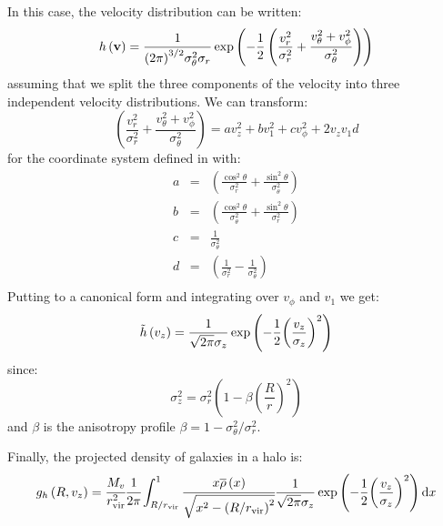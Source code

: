 In this case, the velocity distribution can be written:
\begin{equation}
    h\left(\textbf{v}\right)=
    \frac{1}{{\left({2\pi}\right)}^{3/2}\sigma_{\theta}^2\sigma_r}
    \exp\left(-\frac{1}{2}\left(\frac{v_r^2}{\sigma_r^2}+
    \frac{v_{\theta}^2+v_{\phi}^2}{\sigma_{\theta}^2}\right)\right)
\end{equation}
%
assuming that we split the three components of the velocity into three
independent velocity distributions. We can transform:
%
\begin{equation}
    \label{eq:poly}
    \left(\frac{v_r^2}{\sigma_r^2}+\frac{v_{\theta}^2+
    v_{\phi}^2}{\sigma_{\theta}^2}\right) =
    a v_z^2 + b v_1^2 + c v_\phi^2 + 2 v_z v_1 d
\end{equation}
%
for the coordinate system defined in
with:
%
\begin{eqnarray}
    a&=&\left(\frac{\cos^2\theta}{\sigma_r^2}+
        \frac{\sin^2\theta}{\sigma_\theta^2}\right)\nonumber\\
    b&=&\left(\frac{\cos^2\theta}{\sigma_\theta^2}+
        \frac{\sin^2\theta}{\sigma_r^2}\right)\nonumber\\
    c&=&\frac{1}{\sigma_\theta^2}\nonumber\\
    d&=&\left(\frac{1}{\sigma_r^2}-\frac{1}{\sigma_\theta^2}\right)\nonumber\\
\end{eqnarray}
%
Putting  to a canonical form and integrating
 over $v_\phi$ and $v_1$ we get:
%
\begin{equation} \tilde{h}\left(v_z\right) = \frac{1}{\sqrt{2\pi}\sigma_z}
\exp\left(-\frac{1}{2}{\left(\frac{v_z}{\sigma_z}\right)}^2\right) \end{equation}
%
since:
%
\begin{equation} \sigma_z^2 =
\sigma_r^2\left(1-\beta{\left(\frac{R}{r}\right)}^2\right) \end{equation}
%
and $\beta$ is the anisotropy profile $\beta=1-\sigma_\theta^2/\sigma_r^2$.

Finally, the projected density of galaxies in a halo is:
%
\begin{equation} g_h \left(R, v_z\right) =\cfrac{M_v}{r_{\rm vir}^2}
    \cfrac{1}{2\pi}
    \int_{R/r_{\rm vir}}^1
    \cfrac{x\overline\rho \left(x\right)}{\sqrt{x^2 -
    {\left(R/r_{\rm vir}\right)}^2}}\frac{1}{\sqrt{2\pi}\sigma_z}
    \exp\left(-\frac{1}{2}{\left(\frac{v_z}{\sigma_z}\right)}^2\right){\rm{d}} x
\end{equation}

